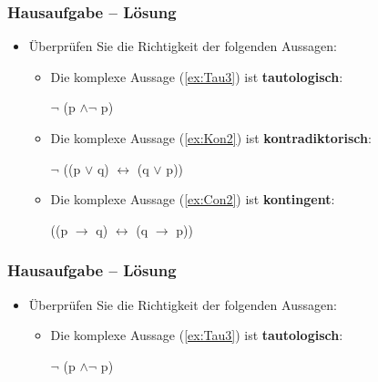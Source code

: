 {
\begin{frame}
\frametitle{Hausaufgabe -- Lösung}

\begin{itemize}
	\item Überprüfen Sie die Richtigkeit der folgenden Aussagen:
	
	\vspace{1em}
	
	\begin{itemize}
		\item Die komplexe Aussage (\ref{ex:Tau3}) ist \textbf{tautologisch}:
		
		\eal
		\ex\label{ex:Tau3} $\lnot$ (p $\land \lnot$ p)
		\zl
		
		\item Die komplexe Aussage (\ref{ex:Kon2}) ist \textbf{kontradiktorisch}:
		
		\eal
		\ex\label{ex:Kon2} $\lnot$ ((p $\lor$ q) $\leftrightarrow$ (q $\lor$ p))
		\zl
		
		\item Die komplexe Aussage (\ref{ex:Con2}) ist \textbf{kontingent}:
		
		\eal
		\ex\label{ex:Con2} ((p $\rightarrow$ q) $\leftrightarrow$ (q $\rightarrow$ p))
		\zl
		
	\end{itemize}	
	
\end{itemize}

\end{frame}


\begin{frame}
\frametitle{Hausaufgabe -- Lösung}

\begin{itemize}
	\item Überprüfen Sie die Richtigkeit der folgenden Aussagen:
	
	\vspace{1em}
	
	\begin{itemize}
		\item Die komplexe Aussage (\ref{ex:Tau3}) ist \textbf{tautologisch}:
		
		\begin{exe}
		 $\lnot$ (p $\land \lnot$ p)
		\end{exe}
	\end{itemize}	
	
\end{itemize}


\end{frame}}
